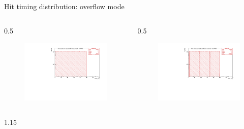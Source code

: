 \documentclass{beamer}
\begin{document}
\begin{frame}{Hit timing distribution: overflow mode}
\vspace{-4mm}
\begin{columns}
    \begin{column}{0.5\framewidth}
        \begin{figure}[H]
          \centering
          \hspace*{-2em}
        \includegraphics[width=1.\columnwidth]{figures/pdf/figure_00007_timedistr_roc_simulation_ch0_281.pdf}
          \label{fig:enter-label} 
          \end{figure}
    \end{column}
    \begin{column}{0.5\framewidth}
        \begin{figure}[H]
          \centering
                    \hspace*{-1em}
        \includegraphics[width=1.\columnwidth]{figures/pdf/figure_00003_timedistr_roc_simulation_ch2_281.pdf}
          \label{fig:enter-label} 
          \end{figure} 
    \end{column}
\end{columns}
 \begin{columns}
    \begin{column}{1.15\framewidth}
    \vspace{0mm}


\end{column}
\end{columns}
\end{frame}
\end{document}
